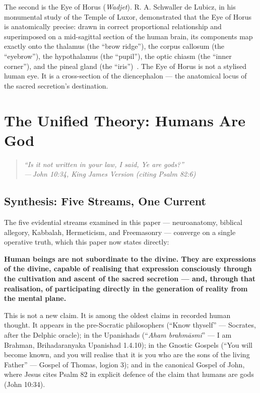\documentclass[12pt, a4paper]{article}
\newcommand{\epigraph}[2]{%
  \begin{quote}
    \itshape ``#1''\\[0.3em]
    \normalfont\small\hfill ---\,#2
  \end{quote}
}
\begin{document}
The second is the Eye of Horus (\emph{Wadjet}). R. A. Schwaller de Lubicz, in
his monumental study of the Temple of Luxor, demonstrated that the Eye of Horus
is anatomically precise: drawn in correct proportional relationship and
superimposed on a mid-sagittal section of the human brain, its components map
exactly onto the thalamus (the ``brow ridge''), the corpus callosum (the
``eyebrow''), the hypothalamus (the ``pupil''), the optic chiasm (the
``inner corner''), and the pineal gland (the ``iris'')~\autocite[198]{schwaller1998}.
The Eye of Horus is not a stylised human eye. It is a cross-section of the
diencephalon — the anatomical locus of the sacred secretion's
destination.

\section{The Unified Theory: Humans Are God}
\label{sec:unified}

\epigraph{Is it not written in your law, I said, Ye are gods?}{John 10:34,
King James Version (citing Psalm 82:6)}

\subsection{Synthesis: Five Streams, One Current}

The five evidential streams examined in this paper — neuroanatomy, biblical
allegory, Kabbalah, Hermeticism, and Freemasonry — converge on a single
operative truth, which this paper now states directly:

\textbf{Human beings are not subordinate to the divine. They are expressions
of the divine, capable of realising that expression consciously through the
cultivation and ascent of the sacred secretion — and, through that realisation,
of participating directly in the generation of reality from the mental plane.}

This is not a new claim. It is among the oldest claims in recorded human
thought. It appears in the pre-Socratic philosophers (``Know thyself'' —
Socrates, after the Delphic oracle); in the Upanishads (``\emph{Aham
brahm\=asmi}'' — I am Brahman, Brihadaranyaka Upanishad 1.4.10); in
the Gnostic Gospels (``You will become known, and you will realise that it is
you who are the sons of the living Father'' — Gospel of Thomas,
logion 3); and in the canonical Gospel of John, where Jesus cites Psalm 82
in explicit defence of the claim that humans are gods (John 10:34).
\end{document}
